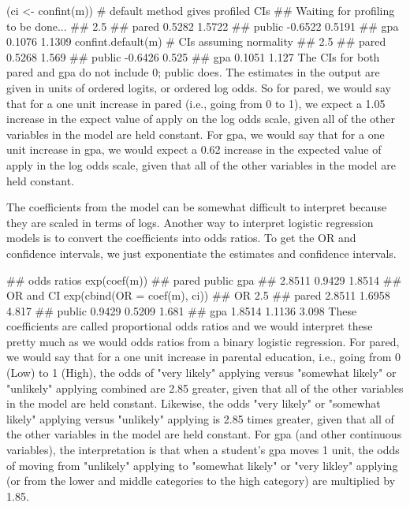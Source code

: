 \documentclass[00-GLMregression.tex]{subfiles}
\begin{document}
(ci <- confint(m)) # default method gives profiled CIs
## Waiting for profiling to be done...
##          2.5 %
## pared   0.5282 1.5722
## public -0.6522 0.5191
## gpa     0.1076 1.1309
confint.default(m) # CIs assuming normality
##          2.5 %
## pared   0.5268  1.569
## public -0.6426  0.525
## gpa     0.1051  1.127
The CIs for both pared and gpa do not include 0; public does. The estimates in the output are given in units of ordered logits, or ordered log odds. So for pared, we would say that for a one unit increase in pared (i.e., going from 0 to 1), we expect a 1.05 increase in the expect value of apply on the log odds scale, given all of the other variables in the model are held constant. For gpa, we would say that for a one unit increase in gpa, we would expect a 0.62 increase in the expected value of apply in the log odds scale, given that all of the other variables in the model are held constant.

The coefficients from the model can be somewhat difficult to interpret because they are scaled in terms of logs. Another way to interpret logistic regression models is to convert the coefficients into odds ratios. To get the OR and confidence intervals, we just exponentiate the estimates and confidence intervals.

## odds ratios
exp(coef(m))
##  pared public    gpa 
## 2.8511 0.9429 1.8514
## OR and CI
exp(cbind(OR = coef(m), ci))
##            OR  2.5 %
## pared  2.8511 1.6958  4.817
## public 0.9429 0.5209  1.681
## gpa    1.8514 1.1136  3.098
These coefficients are called proportional odds ratios and we would interpret these pretty much as we would odds ratios from a binary logistic regression. For pared, we would say that for a one unit increase in parental education, i.e., going from 0 (Low) to 1 (High), the odds of "very likely" applying versus "somewhat likely" or "unlikely" applying combined are 2.85 greater, given that all of the other variables in the model are held constant. Likewise, the odds "very likely" or "somewhat likely" applying versus "unlikely" applying is 2.85 times greater, given that all of the other variables in the model are held constant. For gpa (and other continuous variables), the interpretation is that when a student's gpa moves 1 unit, the odds of moving from "unlikely" applying to "somewhat likely" or "very likley" applying (or from the lower and middle categories to the high category) are multiplied by 1.85.
\end{document}
